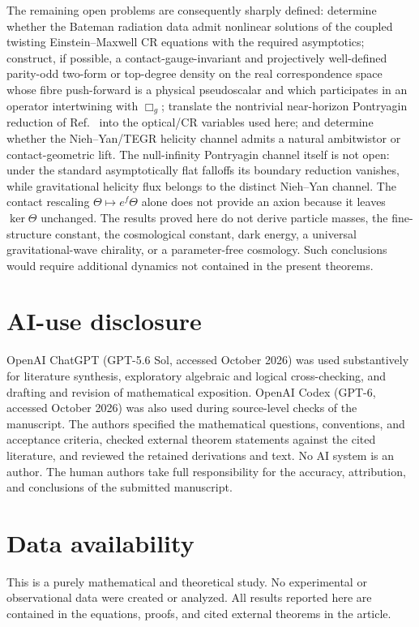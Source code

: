 \documentclass[aps,prd,reprint,nofootinbib,superscriptaddress]{revtex4-2}
\theoremstyle{definition}
\theoremstyle{remark}
\begin{document}
The remaining open problems are consequently sharply defined: determine whether the Bateman radiation data admit nonlinear solutions of the coupled twisting Einstein--Maxwell CR equations with the required asymptotics; construct, if possible, a contact-gauge-invariant and projectively well-defined parity-odd two-form or top-degree density on the real correspondence space whose fibre push-forward is a physical pseudoscalar and which participates in an operator intertwining with $\Box_g$; translate the nontrivial near-horizon Pontryagin reduction of Ref.~\cite{LongZhou2026} into the optical/CR variables used here; and determine whether the Nieh--Yan/TEGR helicity channel admits a natural ambitwistor or contact-geometric lift.  The null-infinity Pontryagin channel itself is not open: under the standard asymptotically flat falloffs its boundary reduction vanishes, while gravitational helicity flux belongs to the distinct Nieh--Yan channel.  The contact rescaling $\Theta\mapsto e^f\Theta$ alone does not provide an axion because it leaves $\ker\Theta$ unchanged. The results proved here do not derive particle masses, the fine-structure constant, the cosmological constant, dark energy, a universal gravitational-wave chirality, or a parameter-free cosmology. Such conclusions would require additional dynamics not contained in the present theorems.

\section*{AI-use disclosure}
OpenAI ChatGPT (GPT-5.6 Sol, accessed October 2026) was used substantively for literature synthesis, exploratory algebraic and logical cross-checking, and drafting and revision of mathematical exposition.  OpenAI Codex (GPT-6, accessed October 2026) was also used during source-level checks of the manuscript.  The authors specified the mathematical questions, conventions, and acceptance criteria, checked external theorem statements against the cited literature, and reviewed the retained derivations and text.  No AI system is an author.  The human authors take full responsibility for the accuracy, attribution, and conclusions of the submitted manuscript.

\section*{Data availability}
This is a purely mathematical and theoretical study.  No experimental or observational data were created or analyzed.  All results reported here are contained in the equations, proofs, and cited external theorems in the article.
\end{document}
